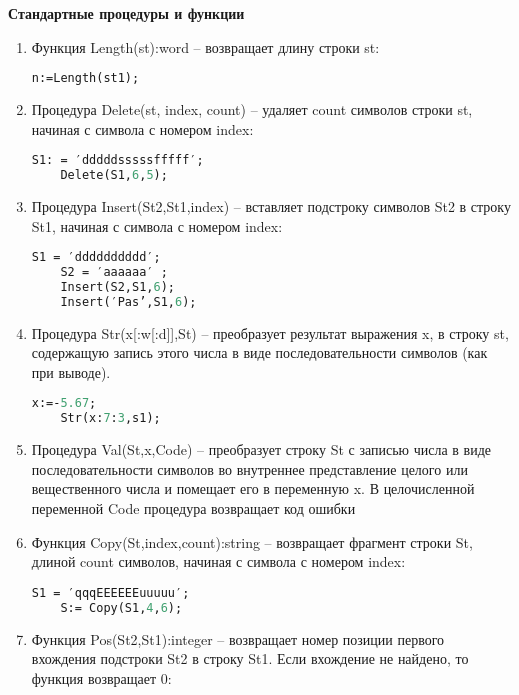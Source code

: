 {\bf{Стандартные процедуры и функции}}

\begin{enumerate}
\item Функция Length(st):word – возвращает длину строки st: 

\begin{lstlisting}[language=Pascal]
	n:=Length(st1);  
\end{lstlisting} 

\item Процедура Delete(st, index, count) – удаляет count символов строки st, начиная с символа с номером index:

\begin{lstlisting}[language=Pascal]
    S1: = ′dddddsssssfffff′; 
	Delete(S1,6,5);  
\end{lstlisting} 

\item Процедура Insert(St2,St1,index) – вставляет подстроку символов St2 в строку St1, начиная с символа с номером index:

\begin{lstlisting}[language=Pascal]
	S1 = ′dddddddddd′;
	S2 = ′аааааа′ ;
	Insert(S2,S1,6);      
	Insert(′Pas’,S1,6);      
\end{lstlisting} 

\item Процедура Str(x[:w[:d]],St) – преобразует результат выражения x, в строку st, содержащую запись этого числа в виде последовательности символов (как при выводе). 

\begin{lstlisting}[language=Pascal]
	x:=-5.67;
	Str(x:7:3,s1);
\end{lstlisting} 

\item Процедура Val(St,x,Code) – преобразует строку St с записью числа в виде последовательности символов во внутреннее представление целого или вещественного числа и помещает его в переменную x.  В целочисленной переменной Code процедура возвращает код ошибки

\item Функция Copy(St,index,count):string – возвращает фрагмент строки St, длиной count символов, начиная с символа с номером index:

\begin{lstlisting}[language=Pascal]
 	S1 = ′qqqEEEEEEuuuuu′;
 	S:= Copy(S1,4,6);     
\end{lstlisting} 

\item Функция Pos(St2,St1):integer – возвращает номер позиции первого вхождения подстроки St2 в строку St1. Если вхождение не найдено, то функция возвращает 0:


\end{enumerate}
